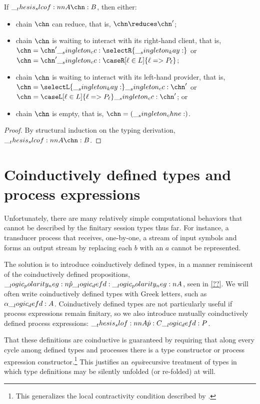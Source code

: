 \begin{theorem}[Progress]
  If $\slcof{A |- \chn : B}$, then either:
  \begin{itemize}[nosep]
  \item chain $\chn$ can reduce, that is, $\chn \reduces \chn'$;
  \item chain $\chn$ is waiting to interact with its right-hand client, that is, $\chn = \chn' \cc \selectR{\kay}$ or $\chn = \chn' \cc \caseR[\ell \in L]{\ell => P_{\ell}}$;
  \item chain $\chn$ is waiting to interact with its left-hand provider, that is, $\chn = \selectL{\kay} \cc \chn'$ or $\chn = \caseL[\ell \in L]{\ell => P_{\ell}} \cc \chn'$; or
  \item chain $\chn$ is empty, that is, $\chn = (\chne)$.
  \end{itemize}
\end{theorem}
\begin{proof}
  By structural induction on the typing derivation, $\slcof{A |- \chn : B}$.
\end{proof}

\clearpage
\section{Coinductively defined types and process expressions}

Unfortunately, there are many relatively simple computational behaviors that cannot be described by the finitary session types thus far.
For instance, a transducer process that receives, one-by-one, a stream of input symbols and forms an output stream by replacing each $b$ with an $a$ cannot be represented.

The solution is to introduce coinductively defined types, in a manner reminiscent of the coinductively defined propositions, $\__logic_polarity_neg:n {\hat{p}} \__logic_defd: \__logic_polarity_neg:n {A}$, seen in \cref{??}.
We will often write coinductively defined types with Greek letters, such as $\alpha \__logic_defd: A$.
Coinductively defined types are not particularly useful if process expressions remain finitary, so we also introduce mutually coinductively defined process expressions: $\slof{A |- \defp{p} : C} \defd P$.

That these definitions are coinductive is guaranteed by requiring that along every cycle among defined types and processes there is a type constructor or process expression constructor.\footnote{This generalizes the local contractivity condition described by \textcite{Gay+Hole:AI05}.}
This justifies an \emph{equi}\-recursive treatment of types in which type definitions may be silently unfolded (or re-folded) at will.

